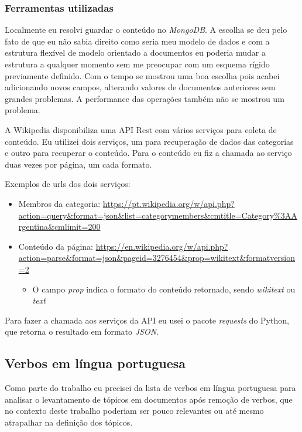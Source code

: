 \subsubsection{Ferramentas utilizadas}

Localmente eu resolvi guardar o conteúdo no \textit{MongoDB}. A escolha se deu pelo fato de que eu não sabia direito como seria meu modelo de dados e 
com a estrutura flexível de modelo orientado a documentos eu poderia mudar a estrutura a qualquer momento sem me preocupar com um esquema rígido
previamente definido. Com o tempo se mostrou uma boa escolha pois acabei adicionando novos campos, alterando valores de documentos anteriores 
sem grandes problemas. A performance das operações também não se mostrou um problema.

A Wikipedia disponibiliza uma API Rest com vários serviços para coleta de conteúdo. Eu utilizei dois serviços, um para recuperação de dados das 
categorias e outro para recuperar o conteúdo. Para o conteúdo eu fiz a chamada ao serviço duas vezes por página, um cada formato.

Exemplos de urls dos dois serviços:
\begin{itemize}
    \item Membros da categoria: \url{https://pt.wikipedia.org/w/api.php?action=query&format=json&list=categorymembers&cmtitle=Category%3AArgentina&cmlimit=200}
    \item Conteúdo da página: \url{https://en.wikipedia.org/w/api.php?action=parse&format=json&pageid=3276454&prop=wikitext&formatversion=2}
    \begin{itemize}
        \item O campo \textit{prop} indica o formato do conteúdo retornado, sendo \textit{wikitext} ou \textit{text}
    \end{itemize} 
\end{itemize}

Para fazer a chamada aos serviços da API eu usei o pacote \textit{requests} do Python, que retorna o resultado em formato \textit{JSON}.

\subsection{Verbos em língua portuguesa}

Como parte do trabalho eu precisei da lista de verbos em língua portuguesa para analisar o levantamento de tópicos em documentos após remoção de verbos, 
que no contexto deste trabalho poderiam ser pouco relevantes ou até mesmo atrapalhar na definição dos tópicos.

